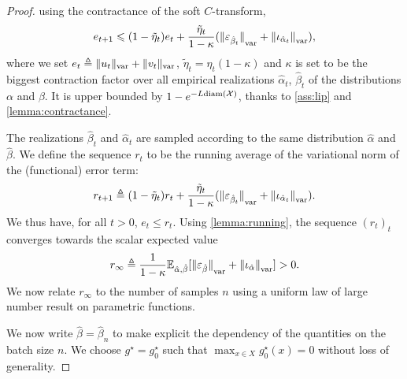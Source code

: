 \begin{proof}
using the contractance of the soft $C$-transform,
\begin{equation}
    \label{eq:ineq_var}
    e_{t+1} \leqslant 
    (1 - \tilde \eta_t) e_t
    +  \frac{\tilde \eta_t}{1 -\kappa}
    ({\Vert \varepsilon_{\hat \beta_t} \Vert}_{\text{\upshape var}} + 
    {\Vert \iota_{\hat \alpha_t} \Vert}_{\text{\upshape var}}),
\end{equation}
where we set $e_t \triangleq \Vert u_t \Vert_{\text{\upshape var}} + \Vert v_t \Vert_{\text{\upshape var}}$,
$\tilde \eta_t = \eta_t (1-\kappa)$ and $\kappa$ is set to be the biggest
contraction factor over all empirical realizations $\hat \alpha_t$, $\hat
\beta_t$ of the distributions $\alpha$ and $\beta$. It is upper bounded by $1 -
e^{- L\text{diam}(\mathcal{X})}$, thanks to \autoref{ass:lip} and
\autoref{lemma:contractance}.

The realizations $\hat \beta_t$ and $\hat \alpha_t$
are sampled according to the same distribution $\hat \alpha$ and $\hat \beta$. We
define the sequence $r_t$ to be the running average of the variational norm of the
(functional) error term:
\begin{equation}
    r_{t+1} \triangleq (1 - \tilde \eta_t) r_t + \frac{\tilde \eta_t}{1 - \kappa}
    ({\Vert \varepsilon_{\hat \beta_t} \Vert}_{\text{\upshape var}} + 
    {\Vert \iota_{\hat \alpha_t} \Vert}_{\text{\upshape var}}).
\end{equation}
We thus have, for all $t > 0$, $e_t \leq r_t$. Using \autoref{lemma:running}, the sequence $(r_t)_t$
converges towards the scalar expected value
\begin{equation}\label{eq:r_infty}
    r_\infty \triangleq \frac{1}{1 - \kappa} \mathbb{E}_{\hat \alpha, \hat \beta}[{\Vert \varepsilon_{\hat \beta} \Vert}_{\text{\upshape var}}
    + {\Vert \iota_{\hat \alpha} \Vert}_{\text{\upshape var}}] > 0.
\end{equation}
We now relate $r_\infty$ to the number of samples $n$ using
a uniform law of large number result on parametric functions.

We now write $\hat \beta = \hat \beta_n$ to make explicit the dependency of the
quantities on the batch size $n$. We choose $g^\star = g^\star_0$ such that
$\max_{x \in X} g^\star_0(x) = 0$ without loss of generality.


\end{proof}
